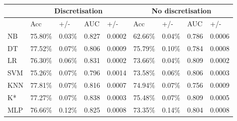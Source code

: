 \begin{table}[htbp]
\caption{}
\begin{tabular}{|l|r|r|r|r|r|r|r|r|}
\hline
 & \multicolumn{ 4}{c|}{Discretisation} & \multicolumn{ 4}{c|}{No discretisation} \\ \hline
 & \multicolumn{1}{l|}{Acc} & \multicolumn{1}{l|}{+/-} & \multicolumn{1}{l|}{AUC} & \multicolumn{1}{l|}{+/-} & \multicolumn{1}{l|}{Acc} & \multicolumn{1}{l|}{+/-} & \multicolumn{1}{l|}{AUC} & \multicolumn{1}{l|}{+/-} \\ \hline
NB & 75.80\% & 0.03\% & 0.827 & 0.0002 & 62.66\% & 0.04\% & 0.786 & 0.0006 \\ \hline
DT & 77.52\% & 0.07\% & 0.806 & 0.0009 & 75.79\% & 0.10\% & 0.784 & 0.0008 \\ \hline
LR & 76.30\% & 0.06\% & 0.831 & 0.0002 & 73.66\% & 0.04\% & 0.809 & 0.0002 \\ \hline
SVM & 75.26\% & 0.07\% & 0.796 & 0.0014 & 73.58\% & 0.06\% & 0.806 & 0.0003 \\ \hline
KNN & 77.81\% & 0.07\% & 0.816 & 0.0007 & 74.94\% & 0.07\% & 0.756 & 0.0009 \\ \hline
K* & 77.27\% & 0.07\% & 0.838 & 0.0003 & 75.48\% & 0.07\% & 0.809 & 0.0005 \\ \hline
MLP & 76.66\% & 0.12\% & 0.825 & 0.0008 & 73.35\% & 0.14\% & 0.804 & 0.0008 \\ \hline
\end{tabular}
\label{}
\end{table}
